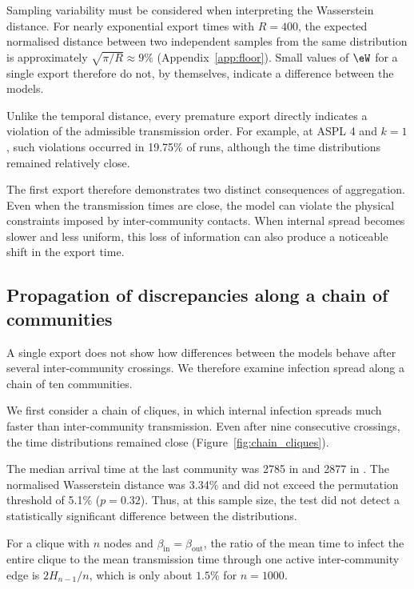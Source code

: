 Sampling variability must be considered when interpreting the Wasserstein distance. For nearly exponential export times with $R=400$, the expected normalised distance between two independent samples from the same distribution is approximately $\sqrt{\pi/R}\approx9\%$ (Appendix~\ref*{app:floor}). Small values of $\eW$ for a single export therefore do not, by themselves, indicate a difference between the models.

Unlike the temporal distance, every premature export directly indicates a violation of the admissible transmission order. For example, at ASPL 4 and $k=1$, such violations occurred in 19.75\% of runs, although the time distributions remained relatively close.

The first export therefore demonstrates two distinct consequences of aggregation. Even when the transmission times are close, the model can violate the physical constraints imposed by inter-community contacts. When internal spread becomes slower and less uniform, this loss of information can also produce a noticeable shift in the export time.


\subsection{Propagation of discrepancies along a chain of communities}
\label{sec:res_chain_random}

A single export does not show how differences between the models behave after several inter-community crossings. We therefore examine infection spread along a chain of ten communities.

We first consider a chain of cliques, in which internal infection spreads much faster than inter-community transmission. Even after nine consecutive crossings, the time distributions remained close (Figure~\ref{fig:chain_cliques}).

The median arrival time at the last community was 2785 in \Full{} and 2877 in \TS{}. The normalised Wasserstein distance was 3.34\% and did not exceed the permutation threshold of 5.1\% ($p=0.32$). Thus, at this sample size, the test did not detect a statistically significant difference between the distributions.

For a clique with $n$ nodes and $\beta_{\mathrm{in}}=\beta_{\mathrm{out}}$, the ratio of the mean time to infect the entire clique to the mean transmission time through one active inter-community edge is $2H_{n-1}/n$, which is only about $1.5\%$ for $n=1000$.

